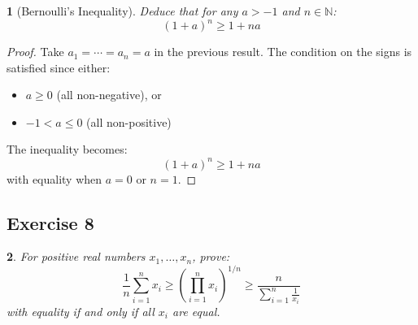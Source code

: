 \documentclass[12pt]{article}
\newtheorem{problem}{}
\begin{document}
\begin{problem}[Bernoulli's Inequality]
Deduce that for any \( a > -1 \) and \( n \in \mathbb{N} \):
\[ (1 + a)^n \geq 1 + na \]
\end{problem}

\begin{proof}
Take \( a_1 = \cdots = a_n = a \) in the previous result. The condition on the signs is satisfied since either:
\begin{itemize}
\item \( a \geq 0 \) (all non-negative), or
\item \(-1 < a \leq 0 \) (all non-positive)
\end{itemize}
The inequality becomes:
\[ (1 + a)^n \geq 1 + na \]
with equality when \( a = 0 \) or \( n = 1 \).
\end{proof}

\subsection*{Exercise 8}
\begin{problem}
For positive real numbers \( x_1, \ldots, x_n \), prove:
\[
\frac{1}{n}\sum_{i=1}^n x_i \geq \left(\prod_{i=1}^n x_i\right)^{1/n} \geq \frac{n}{\sum_{i=1}^n \frac{1}{x_i}}
\]
with equality if and only if all \( x_i \) are equal.
\end{problem}
\end{document}
